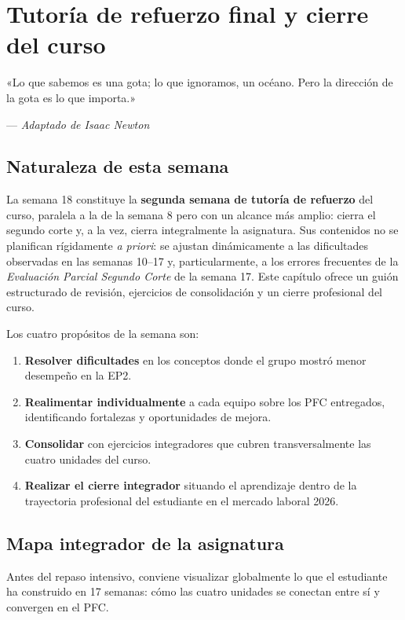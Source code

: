 \documentclass[11pt,a4paper,openany]{book}
\begin{document}
\chapter{Tutoría de refuerzo final y cierre del curso}
\label{cap:semana18}

\epigraph{«Lo que sabemos es una gota; lo que ignoramos, un océano.
Pero la dirección de la gota es lo que importa.»}{--- \textit{Adaptado de
Isaac Newton}}

\section*{Naturaleza de esta semana}
La semana 18 constituye la \textbf{segunda semana de tutoría de
refuerzo} del curso, paralela a la de la semana 8 pero con un alcance
más amplio: cierra el segundo corte y, a la vez, cierra integralmente
la asignatura. Sus contenidos no se planifican rígidamente
\emph{a priori}: se ajustan dinámicamente a las dificultades observadas
en las semanas 10--17 y, particularmente, a los errores frecuentes de
la \emph{Evaluación Parcial Segundo Corte} de la semana 17. Este
capítulo ofrece un guión estructurado de revisión, ejercicios de
consolidación y un cierre profesional del curso.

Los cuatro propósitos de la semana son:

\begin{enumerate}
\item \textbf{Resolver dificultades} en los conceptos donde el grupo
mostró menor desempeño en la EP2.
\item \textbf{Realimentar individualmente} a cada equipo sobre los
PFC entregados, identificando fortalezas y oportunidades de mejora.
\item \textbf{Consolidar} con ejercicios integradores que cubren
transversalmente las cuatro unidades del curso.
\item \textbf{Realizar el cierre integrador} situando el aprendizaje
dentro de la trayectoria profesional del estudiante en el mercado
laboral 2026.
\end{enumerate}

\section{Mapa integrador de la asignatura}

Antes del repaso intensivo, conviene visualizar
globalmente lo que el estudiante ha construido en 17 semanas: cómo
las cuatro unidades se conectan entre sí y convergen en el PFC.
\end{document}
